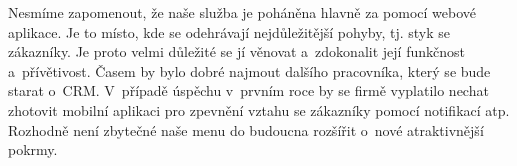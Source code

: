 Nesmíme zapomenout, že naše služba je poháněna hlavně za pomocí webové aplikace. Je to místo, kde se odehrávají nejdůležitější pohyby, tj. styk se zákazníky. Je proto velmi důležité se jí věnovat a~zdokonalit její funkčnost a~přívětivost. Časem by bylo dobré najmout dalšího pracovníka, který se bude starat o~CRM. V~případě úspěchu v~prvním roce by se firmě vyplatilo nechat zhotovit mobilní aplikaci pro zpevnění vztahu se zákazníky pomocí notifikací atp. Rozhodně není zbytečné naše menu do budoucna rozšířit o~nové atraktivnější pokrmy.